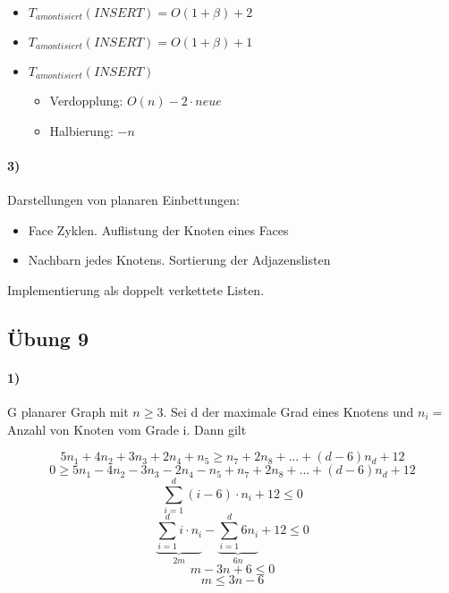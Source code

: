 \begin{itemize}
    \item $ T_{amontisiert} (INSERT) = O(1+\beta) + 2$  
    \item $ T_{amontisiert} (INSERT) = O(1+\beta) + 1$
    \item $ T_{amontisiert} (INSERT)$
    \begin{itemize}
        \item Verdopplung: $O(n) - 2\cdot neue$
        \item Halbierung: $-n$
    \end{itemize}
\end{itemize}

\paragraph{3)} Darstellungen von planaren Einbettungen:
\begin{itemize}
    \item Face Zyklen. Auflistung der Knoten eines Faces 
    \item Nachbarn jedes Knotens. Sortierung der Adjazenslisten
\end{itemize}
Implementierung als doppelt verkettete Listen.


\subsection{Übung 9}
\paragraph{1)} G planarer Graph mit $ n \geq 3 $. Sei d der maximale Grad eines Knotens und $ n_i = $ Anzahl von Knoten vom Grade i. Dann gilt 

$$ 5n_1 + 4n_2 + 3n_3 + 2n_4 + n_5  \geq n_7 + 2n_8 + ... + (d-6) n_d + 12$$
$$ 0 \geq  5n_1 - 4n_2 - 3n_3 - 2n_4 - n_5 + n_7 + 2n_8 + ... + (d-6) n_d + 12$$
$$ \sum_{i = 1}^{d} (i-6) \cdot n_i +12 \leq 0 $$
$$ \underbrace{\sum_{i = 1}^{d} i \cdot n_i}_{2m} - \underbrace{\sum_{i = 1}^{d} 6 n_i}_{6n} +12 \leq 0 $$
$$ m -3n + 6 \leq 0$$
$$ m  \leq 3n - 6 $$

